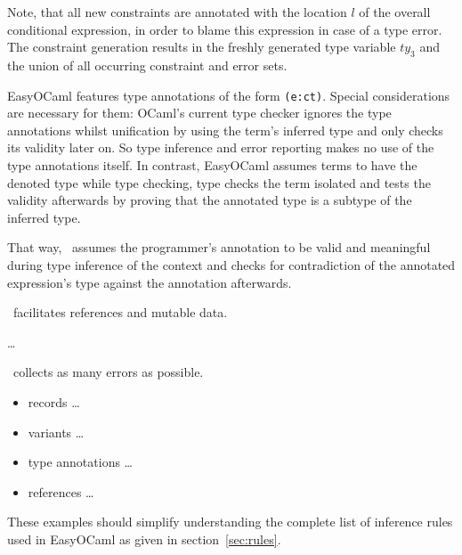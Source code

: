 Note, that all new constraints are annotated with the location $l$ of the
overall conditional expression, in order to blame this expression in case of a
type error.
The constraint generation results in the freshly generated type variable
$ty_3$ and the union of all occurring constraint and error sets.

EasyOCaml features type annotations of the form \texttt{(e:ct)}.
Special considerations are necessary for them:
OCaml's current type checker ignores the type annotations whilst unification by
using the term's inferred type and only checks its validity later on.
So type inference and error reporting makes no use of the type annotations
itself.
In contrast, EasyOCaml assumes terms to have the denoted type while type
checking, type checks the term isolated and tests the validity afterwards by
proving that the annotated type is a subtype of the inferred type.

\begin{center}
\end{center}

That way, \easyocaml\ assumes the programmer's annotation to be valid and
meaningful during type inference of the context and checks for contradiction
of the annotated expression's type against the annotation afterwards.

\easyocaml\ facilitates references and mutable data.

\dots

\easyocaml\ collects as many errors as possible.

\begin{itemize}
    \item records \ldots{}
    \item variants \ldots{}
    \item type annotations \ldots{}
    \item references \ldots{}
\end{itemize}

These examples should simplify understanding the complete list of inference
rules used in EasyOCaml as given in section~\ref{sec:rules}.
